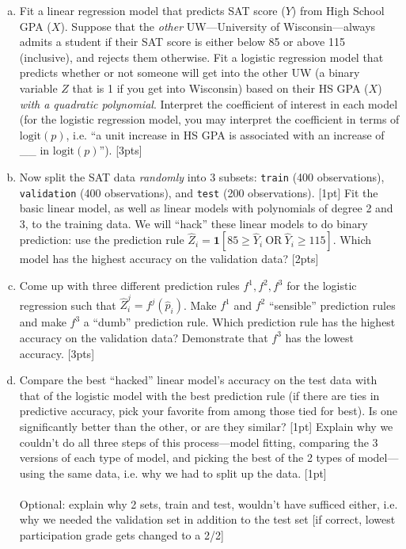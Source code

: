\documentclass[12pt]{article}
\newcommand{\Ind}{\textbf{1}}
\newcommand{\logit}{\text{logit}}
\begin{document}
\begin{enumerate}[(a)]
	\item Fit a linear regression model that predicts SAT score ($Y$) from High School GPA ($X$). Suppose that the \textit{other} UW---University of Wisconsin---always admits a student if their SAT score is either below 85 or above 115 (inclusive), and rejects them otherwise. Fit a logistic regression model that predicts whether or not someone will get into the other UW (a binary variable $Z$ that is 1 if you get into Wisconsin) based on their HS GPA ($X$) \textit{with a quadratic polynomial}. Interpret the coefficient of interest in each model (for the logistic regression model, you may interpret the coefficient in terms of $\logit(p)$, i.e. ``a unit increase in HS GPA is associated with an increase of \_\_ in $\logit(p)$''). [3pts]
	\item Now split the SAT data \textit{randomly} into 3 subsets: \verb|train| (400 observations), \verb|validation| (400 observations), and \verb|test| (200 observations). [1pt] Fit the basic linear model, as well as linear models with polynomials of degree 2 and 3, to the training data. We will ``hack'' these linear models to do binary prediction: use the prediction rule $\hat{Z}_i = \Ind[85 \ge \hat{Y}_i~\text{OR}~\hat{Y}_i \ge 115]$. Which model has the highest accuracy on the validation data? [2pts]
	\item Come up with three different prediction rules $f^1,f^2,f^3$ for the logistic regression such that $\hat{Z}_i^j = f^j(\hat{p}_i)$. Make $f^1$ and $f^2$ ``sensible'' prediction rules and make $f^3$ a ``dumb'' prediction rule. Which prediction rule has the highest accuracy on the validation data? Demonstrate that $f^3$ has the lowest accuracy. [3pts]
	\item Compare the best ``hacked'' linear model's accuracy on the test data with that of the logistic model with the best prediction rule (if there are ties in predictive accuracy, pick your favorite from among those tied for best). Is one significantly better than the other, or are they similar? [1pt] Explain why we couldn't do all three steps of this process---model fitting, comparing the 3 versions of each type of model, and picking the best of the 2 types of model---using the same data, i.e. why we had to split up the data. [1pt]\\\\ Optional: explain why 2 sets, train and test, wouldn't have sufficed either, i.e. why we needed the validation set in addition to the test set [if correct, lowest participation grade gets changed to a 2/2]
\end{enumerate}
\end{document}
